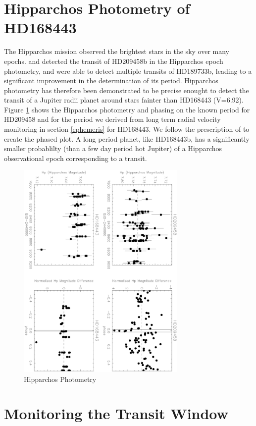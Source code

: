 \documentclass[12pt,preprint]{emulateapj}
\begin{document}
\section{Hipparchos Photometry of HD168443}
The Hipparchos mission observed the brightest stars in the sky over many epochs. \citet{Robichon00} and \citet{Castellano00} detected the transit of HD209458b in the Hipparchos epoch photometry, and \citet{Hebrard06} were able to detect multiple transits of HD189733b, leading to a significant improvement in the determination of its period.  Hipparchos photometry has therefore been demonstrated to be precise enought to detect the transit of a Jupiter radii planet around stars fainter than HD168443 (V=6.92).  Figure \ref{fig:hip} shows the Hipparchos photometry and phasing on the known period for HD209458 and for the period we derived from long term radial velocity monitoring in section \ref{ephemeris} for HD168443. We follow the prescription of \citet{Robichon00} to create the phased plot. A long period planet, like HD168443b, has a significantly smaller probablilty (than a few day period hot Jupiter) of a Hipparchos observational epoch corresponding to a transit. 

\begin{figure}[h]
  \includegraphics[angle=90,width=8.2cm]{HipparcosCheck}
  \caption{Hipparchos Photometry}
  \label{fig:hip}
\end{figure}



\section{Monitoring the Transit Window}
\end{document}
